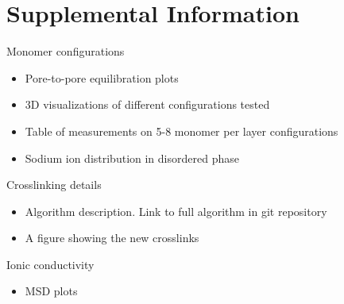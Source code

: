 \documentclass{article}
\begin{document}
	\section{Supplemental Information}
	
	Monomer configurations
	\begin{itemize}
		\item Pore-to-pore equilibration plots
		\item 3D visualizations of different configurations tested
		\item Table of measurements on 5-8 monomer per layer configurations
		\item Sodium ion distribution in disordered phase
	\end{itemize}
	
	\noindent Crosslinking details
	\begin{itemize}
		\item Algorithm description. Link to full algorithm in git repository
		\item A figure showing the new crosslinks
	\end{itemize}
	
	\noindent Ionic conductivity %
	\begin{itemize}
		\item MSD plots
	\end{itemize}
\end{document}
